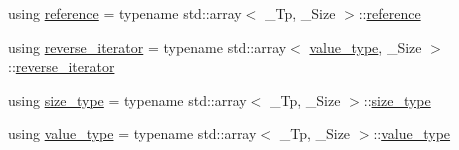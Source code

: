 \begin{DoxyCompactItemize}
\item 
using \hyperlink{class____gnu__cxx_1_1__StaticPolynomial_a2416b66d254edf3e7118a8fb1204403f}{reference} = typename std\+::array$<$ \+\_\+\+Tp, \+\_\+\+Size $>$\+::\hyperlink{class____gnu__cxx_1_1__StaticPolynomial_a2416b66d254edf3e7118a8fb1204403f}{reference}
\item 
using \hyperlink{class____gnu__cxx_1_1__StaticPolynomial_a6313ff2d9e03c7911016595440c6a2ae}{reverse\+\_\+iterator} = typename std\+::array$<$ \hyperlink{class____gnu__cxx_1_1__StaticPolynomial_aad5f3d6d5876b6926b30724aeac649d6}{value\+\_\+type}, \+\_\+\+Size $>$\+::\hyperlink{class____gnu__cxx_1_1__StaticPolynomial_a6313ff2d9e03c7911016595440c6a2ae}{reverse\+\_\+iterator}
\item 
using \hyperlink{class____gnu__cxx_1_1__StaticPolynomial_a0cc0aa4adab35686ef2474e07f511ff9}{size\+\_\+type} = typename std\+::array$<$ \+\_\+\+Tp, \+\_\+\+Size $>$\+::\hyperlink{class____gnu__cxx_1_1__StaticPolynomial_a0cc0aa4adab35686ef2474e07f511ff9}{size\+\_\+type}
\item 
using \hyperlink{class____gnu__cxx_1_1__StaticPolynomial_aad5f3d6d5876b6926b30724aeac649d6}{value\+\_\+type} = typename std\+::array$<$ \+\_\+\+Tp, \+\_\+\+Size $>$\+::\hyperlink{class____gnu__cxx_1_1__StaticPolynomial_aad5f3d6d5876b6926b30724aeac649d6}{value\+\_\+type}
\end{DoxyCompactItemize}
